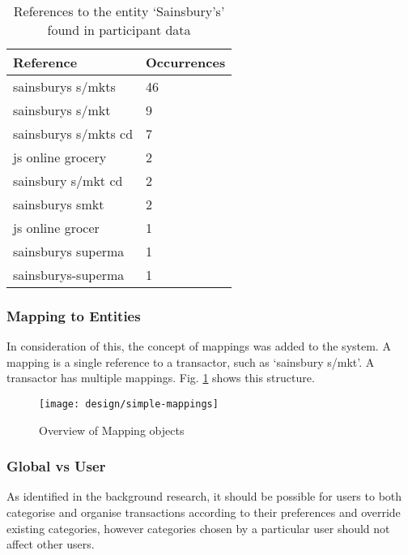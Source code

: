 \begin{table}[h]
\centering
\begin{tabular}{@{}ll@{}}
\toprule
Reference            & Occurrences \\ \midrule
sainsburys s/mkts    & 46          \\
sainsburys s/mkt     & 9           \\
sainsburys s/mkts cd & 7           \\
js online grocery    & 2           \\
sainsbury s/mkt cd   & 2           \\
sainsburys smkt      & 2           \\
js online grocer     & 1           \\
sainsburys superma   & 1           \\
sainsburys-superma   & 1           \\ \bottomrule
\end{tabular}
\caption{References to the entity `Sainsbury's' found in participant data}
\label{tab:sainsburys}
\end{table}

\subsubsection{Mapping to Entities}
In consideration of this, the concept of mappings was added to the system. A \gls{mapping} is a single \gls{reference} to a transactor, such as `sainsbury s/mkt'. A transactor has multiple mappings. Fig. \ref{fig:mapping} shows this structure.

\begin{figure}[h]
    \centering
    \texttt{[image: design/simple-mappings]}
    \caption{Overview of Mapping objects}
    \label{fig:mapping}
\end{figure}

\subsubsection{Global vs User}
As identified in the background research, it should be possible for users to both categorise and organise transactions according to their preferences and override existing categories, however categories chosen by a particular user should not affect other users. 

